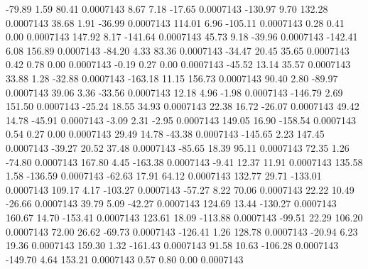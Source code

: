       -79.89        1.59       80.41     0.0007143
        8.67        7.18      -17.65     0.0007143
     -130.97        9.70      132.28     0.0007143
       38.68        1.91      -36.99     0.0007143
      114.01        6.96     -105.11     0.0007143
        0.28        0.41        0.00     0.0007143
      147.92        8.17     -141.64     0.0007143
       45.73        9.18      -39.96     0.0007143
     -142.41        6.08      156.89     0.0007143
      -84.20        4.33       83.36     0.0007143
      -34.47       20.45       35.65     0.0007143
        0.42        0.78        0.00     0.0007143
       -0.19        0.27        0.00     0.0007143
      -45.52       13.14       35.57     0.0007143
       33.88        1.28      -32.88     0.0007143
     -163.18       11.15      156.73     0.0007143
       90.40        2.80      -89.97     0.0007143
       39.06        3.36      -33.56     0.0007143
       12.18        4.96       -1.98     0.0007143
     -146.79        2.69      151.50     0.0007143
      -25.24       18.55       34.93     0.0007143
       22.38       16.72      -26.07     0.0007143
       49.42       14.78      -45.91     0.0007143
       -3.09        2.31       -2.95     0.0007143
      149.05       16.90     -158.54     0.0007143
        0.54        0.27        0.00     0.0007143
       29.49       14.78      -43.38     0.0007143
     -145.65        2.23      147.45     0.0007143
      -39.27       20.52       37.48     0.0007143
      -85.65       18.39       95.11     0.0007143
       72.35        1.26      -74.80     0.0007143
      167.80        4.45     -163.38     0.0007143
       -9.41       12.37       11.91     0.0007143
      135.58        1.58     -136.59     0.0007143
      -62.63       17.91       64.12     0.0007143
      132.77       29.71     -133.01     0.0007143
      109.17        4.17     -103.27     0.0007143
      -57.27        8.22       70.06     0.0007143
       22.22       10.49      -26.66     0.0007143
       39.79        5.09      -42.27     0.0007143
      124.69       13.44     -130.27     0.0007143
      160.67       14.70     -153.41     0.0007143
      123.61       18.09     -113.88     0.0007143
      -99.51       22.29      106.20     0.0007143
       72.00       26.62      -69.73     0.0007143
     -126.41        1.26      128.78     0.0007143
      -20.94        6.23       19.36     0.0007143
      159.30        1.32     -161.43     0.0007143
       91.58       10.63     -106.28     0.0007143
     -149.70        4.64      153.21     0.0007143
        0.57        0.80        0.00     0.0007143
